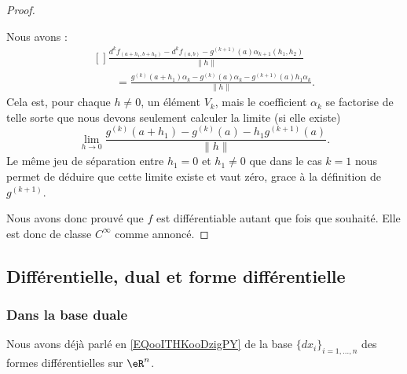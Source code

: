 \begin{proof}
\begin{subproof}
    Nous avons :
    \begin{equation}
        \begin{aligned}[]
            \frac{ d^kf_{(a+h_1,b+h_2)}-d^kf_{(a,b)}-g^{(k+1)}(a)\alpha_{k+1}(h_1,h_2) }{ \| h \| }\\
            \qquad=
            \frac{ g^{(k)}(a+h_1)\alpha_k-g^{(k)}(a)\alpha_k-g^{(k+1)}(a)h_1\alpha_k }{ \| h \| }.
        \end{aligned}
    \end{equation}
    Cela est, pour chaque \( h\neq 0\), un élément \( V_k\), mais le coefficient \( \alpha_k\) se factorise de telle sorte que nous devons seulement calculer la limite (si elle existe)
    \begin{equation}
        \lim_{h\to 0} \frac{ g^{(k)}(a+h_1)-g^{(k)}(a)-h_1g^{(k+1)}(a) }{ \| h \| }.
    \end{equation}
    Le même jeu de séparation entre \( h_1=0\) et \( h_1\neq 0\) que dans le cas \( k=1\) nous permet de déduire que cette limite existe et vaut zéro, grace à la définition de \( g^{(k+1)}\).
    \end{subproof}

    Nous avons donc prouvé que \( f\) est différentiable autant que fois que souhaité. Elle est donc de classe \(  C^{\infty}\) comme annoncé.
\end{proof}

\subsection{Différentielle, dual et forme différentielle}

\subsubsection{Dans la base duale}

Nous avons déjà parlé en \eqref{EQooITHKooDzigPY} de la base \( \{ dx_i \}_{i=1,\ldots, n}\) des formes différentielles sur \( \eR^n\).

